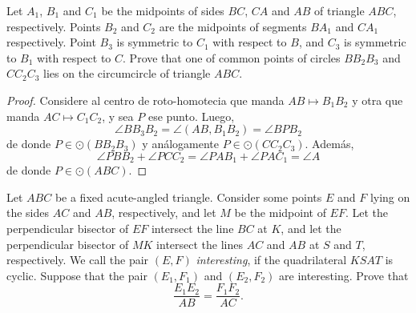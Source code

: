 \begin{probEG}
	Let $A_1$, $B_1$ and $C_1$ be the midpoints of sides $BC$, $CA$ and $AB$ of triangle $ABC$, respectively. Points $B_2$ and $C_2$ are the midpoints of segments $BA_1$ and $CA_1$ respectively. Point $B_3$ is symmetric to $C_1$ with respect to $B$, and $C_3$ is symmetric to $B_1$ with respect to $C$.
Prove that one of common points of circles $BB_2B_3$ and $CC_2C_3$ lies on the circumcircle of triangle $ABC$.
\end{probEG}

\begin{proof}
	Considere al centro de roto-homotecia que manda $AB\mapsto B_1B_2$ y otra que manda $AC\mapsto C_1C_2$, y sea $P$ ese punto. Luego,
	\[\angle BB_3B_2=\angle(AB,B_1B_2)=\angle BPB_2\]
	de donde $P\in\odot(BB_2B_3)$ y análogamente $P\in\odot(CC_2C_3)$. Además,
	\[\angle PBB_2+\angle PCC_2=\angle PAB_1+\angle PAC_1=\angle A\]
	de donde $P\in\odot(ABC)$.
\end{proof}

\begin{problem}[ISL 2014/G6]
	Let $ABC$ be a fixed acute-angled triangle. Consider some points $E$ and $F$ lying on the sides $AC$ and $AB$, respectively, and let $M$ be the midpoint of $EF$. Let the perpendicular bisector of $EF$ intersect the line $BC$ at $K$, and let the perpendicular bisector of $MK$ intersect the lines $AC$ and $AB$ at $S$ and $T$, respectively. We call the pair $(E,F)$ \emph{interesting}, if the quadrilateral $KSAT$ is cyclic. Suppose that the pair $(E_1,F_1)$ and $(E_2,F_2)$ are interesting. Prove that
	\[\frac{E_1E_2}{AB}=\frac{F_1F_2}{AC}.\]
\end{problem}
